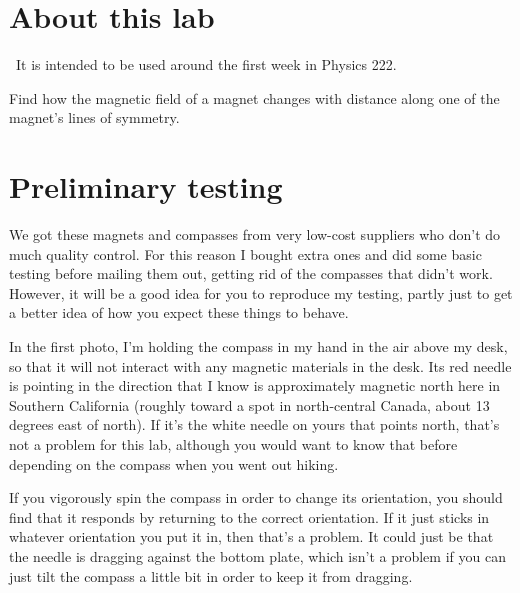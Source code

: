 \renewcommand\thechapter{c2.1}
\label{lab:field-of-a-permanent-magnet}

\section*{About this lab}

\covid\ 
It is intended to be used around the first week in Physics 222.

\apparatus
{}

\begin{goals}

\item[] Find how the magnetic field of a magnet changes with
distance along one of the magnet's lines of symmetry.

\end{goals}


\section*{Preliminary testing}

We got these magnets and compasses from very low-cost suppliers who don't do much
quality control. For this reason I bought extra ones and did some basic testing
before mailing them out, getting rid of the compasses that didn't work.
However, it will be a good idea for you to reproduce my
testing, partly just to get a better idea of how you expect these things to behave.

In the first photo, I'm holding the compass in my hand in the air above my desk, so
that it will not interact with any magnetic materials in the desk. Its red needle is
pointing in the direction that I know is approximately magnetic north here in
Southern California (roughly toward a spot in north-central Canada, about 13 degrees
east of north). If it's the white needle on yours that points north, that's not a
problem for this lab, although you would want to know that before depending on
the compass when you went out hiking.


If you vigorously spin the compass in order
to change its orientation, you should find that it responds by returning to the
correct orientation. If it just sticks in whatever orientation you put it in, then that's
a problem. It could just be that the needle is dragging against the bottom plate, which
isn't a problem if you can just tilt the compass a little bit in order to keep it from
dragging.

